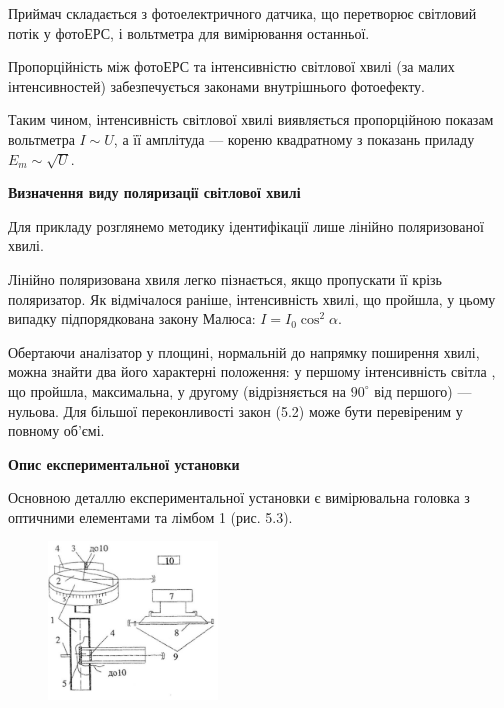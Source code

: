 \documentclass[12pt,a4paper]{article}
\begin{document}
    Приймач складається з фотоелектричного датчика, що перетворює світловий
    потік у фотоЕРС, і вольтметра для вимірювання останньої.

    Пропорційність між фотоЕРС та інтенсивністю світлової хвилі (за малих
    інтенсивностей) забезпечується законами внутрішнього фотоефекту.

    Таким чином, інтенсивність світлової хвилі виявляється пропорційною показам
    вольтметра $I \sim U$, а її амплітуда --- кореню квадратному з показань приладу
    $E_m \sim \sqrt{U}$.

    \textbf{Визначення виду поляризації світлової хвилі}

    Для прикладу розглянемо методику ідентифікації лише лінійно поляризованої хвилі.

    Лінійно поляризована хвиля легко пізнається, якщо пропускати її крізь
    поляризатор. Як відмічалося раніше, інтенсивність хвилі, що пройшла, у цьому випадку
    підпорядкована закону Малюса: $I = I_0 \cos^2 \alpha$.

    Обертаючи аналізатор у площині,
    нормальній до напрямку поширення хвилі, можна знайти два його характерні
    положення: у першому інтенсивність світла , що пройшла, максимальна, у другому
    (відрізняється на $90^{\circ}$ від першого) --- нульова. Для більшої переконливості закон (5.2)
    може бути перевіреним у повному об'ємі.

    \begin{center} \textbf{Опис експериментальної установки} \end{center}

    Основною деталлю експериментальної
    установки є вимірювальна головка з оптичними
    елементами та лімбом 1 (рис. 5.3).

    \begin{figure}[!ht]

        \renewcommand{\thefigure}{5.\arabic{figure}} %

        \centering
        \includegraphics[width=0.4\textwidth]{5.3.png}
        \caption{}
        \label{fig3:schema}

    \end{figure}
\end{document}
